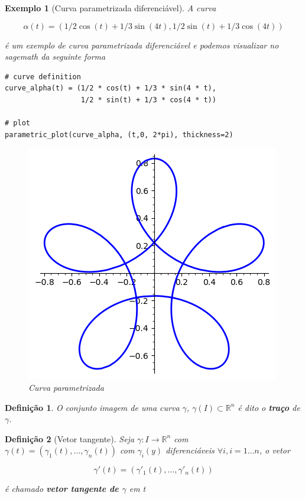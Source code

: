 \documentclass[12pt]{article}
\newtheorem{ex}{Exemplo}[section]
\newtheorem{definition}{Definição}
\begin{document}
\begin{ex}[Curva parametrizada diferenciável] A curva 

$$\alpha(t) = (1/2 \cos(t) + 1/3 \sin(4 t), 1/2 \sin(t) + 1/3 \cos(4 t))$$ 

é um exemplo de curva parametrizada diferenciável e podemos visualizar no \textit{sagemath} da seguinte forma
\begin{lstlisting}
# curve definition
curve_alpha(t) = (1/2 * cos(t) + 1/3 * sin(4 * t), 
                  1/2 * sin(t) + 1/3 * cos(4 * t))

# plot
parametric_plot(curve_alpha, (t,0, 2*pi), thickness=2)
\end{lstlisting}

\begin{figure}[H]
    \centering
    \includegraphics[scale=.6]{Images/ex1.1.png}
    \caption{Curva parametrizada}
    \label{fig:ex1.1}
\end{figure}
\end{ex}

\begin{definition}
O conjunto imagem de uma curva $\gamma$, $\gamma(I) \subset \mathbb{R}^n$ é dito o \textbf{traço} de $\gamma$.
\end{definition}

\begin{definition}[Vetor tangente]
Seja $\gamma: I \rightarrow \mathbb{R}^n$ com $\gamma(t) = (\gamma_1 (t), \ldots, \gamma_n (t))$ com $\gamma_i (y)$ diferenciáveis $\forall i, i = 1 \ldots n$, o vetor

$$\gamma'(t) = (\gamma'_1 (t), \ldots, \gamma'_n (t))$$

é chamado \textbf{vetor tangente de $\gamma$} em t
\end{definition}
\end{document}
